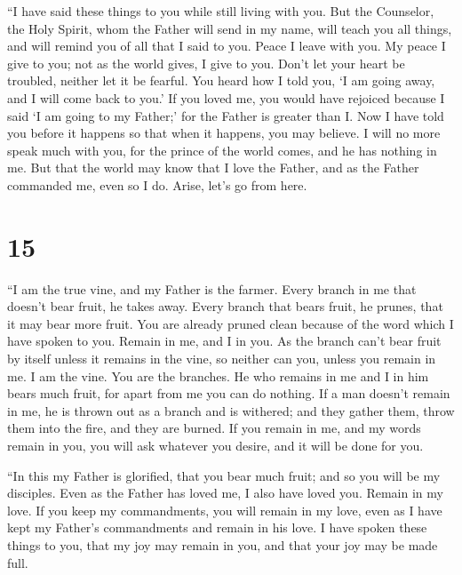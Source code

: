  ``I have said these things to you while still living
with you.  But the Counselor, the Holy Spirit, whom the
Father will send in my name, will teach you all things, and will remind
you of all that I said to you.  Peace I leave with you.
My peace I give to you; not as the world gives, I give to you. Don't let
your heart be troubled, neither let it be fearful.  You
heard how I told you, `I am going away, and I will come back to you.' If
you loved me, you would have rejoiced because I said `I am going to my
Father;' for the Father is greater than I.  Now I have
told you before it happens so that when it happens, you may believe.
 I will no more speak much with you, for the prince of
the world comes, and he has nothing in me.  But that the
world may know that I love the Father, and as the Father commanded me,
even so I do. Arise, let's go from here.

\hypertarget{section-14}{%
\section{15}\label{section-14}}

 ``I am the true vine, and my Father is the farmer.
 Every branch in me that doesn't bear fruit, he takes
away. Every branch that bears fruit, he prunes, that it may bear more
fruit.  You are already pruned clean because of the word
which I have spoken to you.  Remain in me, and I in you.
As the branch can't bear fruit by itself unless it remains in the vine,
so neither can you, unless you remain in me.  I am the
vine. You are the branches. He who remains in me and I in him bears much
fruit, for apart from me you can do nothing.  If a man
doesn't remain in me, he is thrown out as a branch and is withered; and
they gather them, throw them into the fire, and they are burned.
 If you remain in me, and my words remain in you, you will
ask whatever you desire, and it will be done for you.

 ``In this my Father is glorified, that you bear much
fruit; and so you will be my disciples.  Even as the
Father has loved me, I also have loved you. Remain in my love.
 If you keep my commandments, you will remain in my love,
even as I have kept my Father's commandments and remain in his love.
 I have spoken these things to you, that my joy may
remain in you, and that your joy may be made full.

